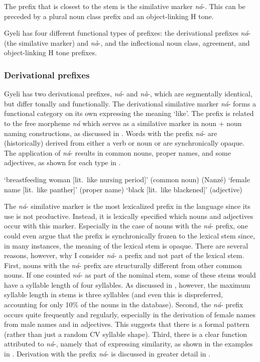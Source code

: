 \noindent The prefix that is closest to the stem is the similative marker {\itshape ná}-. This can be preceded by a plural noun class prefix and an object-linking H tone. 

Gyeli has four different functional types of prefixes: the derivational prefixes {\itshape ná}- (the similative marker) and {\itshape nà}-, and  the inflectional noun class, agreement, and object-linking H tone prefixes. 



\subsubsection{Derivational prefixes} 
\label{sec:SIM}

Gyeli has two derivational prefixes, {\itshape ná}- and {\itshape nà}-, which are segmentally identical, but differ tonally and functionally.
The derivational similative marker {\itshape ná}- forms a functional category on its own expressing the meaning `like'. The prefix is related to the free morpheme {\itshape ná} which serves as a similative marker in noun + noun naming constructions, as discussed in . Words with the prefix {\itshape ná}- are (historically) derived from  either a verb or noun or are synchronically opaque.  The application of {\itshape ná}- results in common nouns, proper names,  and some adjectives, as shown for each type in .

\ea \label{SIMNouns}
 `breastfeeding woman [lit.\ like nursing period]' (common noun)
 (Nanzé) `female name [lit.\ like panther]' (proper name)
 `black [lit.\ like blackened]' (adjective)
\z
\z

The {\itshape ná}- similative marker is the most lexicalized prefix in the language since its use is not productive. Instead,  it is lexically specified which nouns and adjectives occur with this marker.  Especially in the case of nouns with the {\itshape ná}- prefix, one could even argue that the prefix is synchronically frozen to the lexical stem since, in many instances, the meaning of the lexical stem is opaque.  There are several reasons, however, why I consider {\itshape ná}- a prefix and not part of the lexical stem.  First, nouns with the {\itshape ná}- prefix are structurally different from other common nouns. If one counted {\itshape ná}- as part of the nominal stem, some of these stems would have a syllable length of four syllables. As discussed in , however, the maximum syllable length in stems is three syllables (and even this is dispreferred, accounting for only 10\% of the nouns in the database).  Second,  the {\itshape ná}- prefix occurs quite frequently and regularly, especially in the derivation of female names from male names and in adjectives. This suggests that there is a formal pattern (rather than just a random CV syllable shape).   Third,  there is a clear function attributed to {\itshape ná}-, namely that of expressing similarity, as shown in the examples in .  Derivation with the prefix {\itshape ná}- is discussed in greater detail in .

